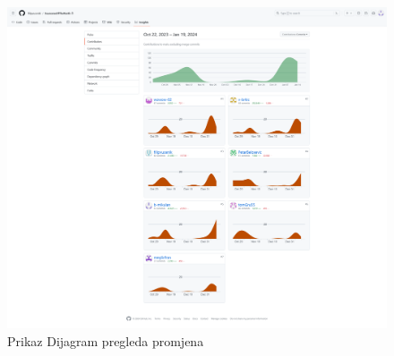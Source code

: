 		\begin{figure}[H]
			\includegraphics[width=\textwidth]{slike/dijagramPromjena.png} %
			\caption{Prikaz Dijagram pregleda promjena}
			\label{fig:dijagramPromjena} %
		\end{figure}
		